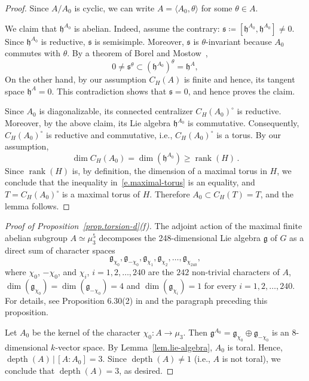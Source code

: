 \documentclass[12pt]{amsart}
\numberwithin{equation}{section}
\theoremstyle{remark}
\newcommand{\rank}{\operatorname{rank}}
\newcommand{\depth}{\operatorname{depth}}
\begin{document}
\begin{proof} Since $A/A_0$ is cyclic, we can write $A = \langle A_0, \theta \rangle$ for some $\theta \in A$.
    
    We claim that $\mathfrak h^{A_0}$ is abelian. Indeed, assume the contrary: $\mathfrak s \coloneqq  [\mathfrak h^{A_0},\mathfrak h^{A_0}] \neq 0$. 
    Since $\mathfrak h^{A_0}$ is reductive, $\mathfrak s$ is semisimple.  Moreover, $\mathfrak s$ is $\theta$-invariant because $A_0$ commutes with $\theta$.
    By a theorem of Borel and Mostow~\cite[Proposition~4.3]{borel1955semi-simple}, 
    \[ 0 \neq {\mathfrak s}^\theta \subset (\mathfrak h^{A_0})^\theta = \mathfrak h^A, \]
    On the other hand, by our assumption $C_H(A)$ is finite and hence, its tangent space $\mathfrak h^A = 0$. This contradiction shows that $\mathfrak s=0$, and hence proves the claim. 

      Since $A_0$ is diagonalizable, its connected centralizer $C_H(A_0)^\circ$ is reductive. Moreover, by the above claim, its Lie algebra $\mathfrak h^{A_0}$ is commutative. Consequently, $C_H(A_0)^\circ$ is reductive and commutative, i.e., $C_H(A_0)^\circ$ is a torus. By our assumption, 
       \begin{equation} \label{e.maximal-torus}
       \dim  C_H(A_0) = \dim (\mathfrak h^{A_0}) \geqslant \rank(H) \, . 
       \end{equation}
        Since $\rank(H)$ is, by definition, the dimension of a maximal torus in $H$, we conclude that the inequality in~\eqref{e.maximal-torus} is an equality, and
        $T = C_H(A_0)^\circ$ is a maximal torus of $H$. Therefore
        $A_0 \subset C_H(T) = T$, and the lemma follows.
\end{proof}

\begin{proof}[Proof of Proposition~\ref{prop.torsion-d}(f)] 
The adjoint action
of the maximal finite abelian subgroup $A \simeq \mu_3^5$ decomposes the 248-dimensional Lie algebra $\mathfrak g$ of $G$ as a direct sum of character spaces
\[ \mathfrak g_{\chi_0}, \mathfrak  g_{-\chi_0}, \mathfrak g_{\chi_1}, \mathfrak g_{\chi_2}, 
\ldots ,\mathfrak g_{\chi_{240}}, \]
where $\chi_0$, $- \chi_0$, and $\chi_i$, $i = 1, 2, \ldots, 240$ are the $242$ non-trivial characters of $A$,
$\dim(\mathfrak g_{\chi_0}) = \dim (\mathfrak g_{-\chi_0}) = 4$ and $\dim(\mathfrak g_{\chi_i}) = 1$ for every $i = 1, 2, \ldots, 240$. For details, see Proposition 6.30(2) in \cite{elduque-kochetov13} and the paragraph preceding this proposition.

Let $A_0$ be the kernel of the character
$\chi_0 \colon A \to \mu_3$. Then $\mathfrak{g}^{A_0} = \mathfrak g_{\chi_0} \oplus \mathfrak g_{-\chi_0}$
is an $8$-dimensional $k$-vector space. By Lemma~\ref{lem.lie-algebra},
$A_0$ is toral. Hence, $\depth(A) \, | \, [A:A_0] = 3$. Since $\depth(A) \neq 1$ (i.e., $A$ is not toral), we conclude that $\depth(A) = 3$, as desired.
\end{proof}
\end{document}
